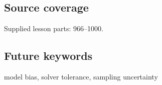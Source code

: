 \subsection{Source coverage}\label{appendix-31b8c295e05f-source-coverage}

\hypertarget{appendix-31b8c295e05f-source-coverage}{}

Supplied lesson parts: 966--1000.

\subsection{Future keywords}\label{appendix-31b8c295e05f-future-keywords}

\hypertarget{appendix-31b8c295e05f-future-keywords}{}

model bias, solver tolerance, sampling uncertainty
